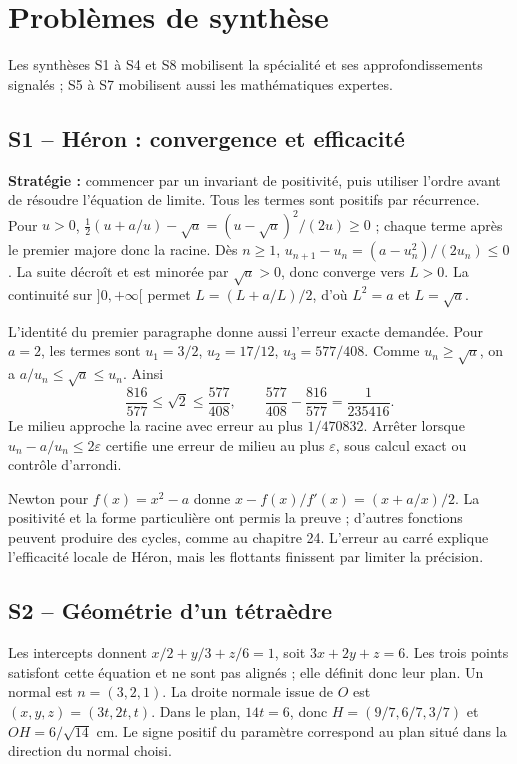 \chapter{Problèmes de synthèse}
Les synthèses S1 à S4 et S8 mobilisent la spécialité et ses approfondissements signalés ; S5 à S7 mobilisent aussi les mathématiques expertes.
\section{S1 -- Héron : convergence et efficacité}
\textbf{Stratégie :} commencer par un invariant de positivité, puis utiliser l'ordre avant de résoudre l'équation de limite.
Tous les termes sont positifs par récurrence. Pour $u>0$, $\frac12(u+a/u)-\sqrt a=(u-\sqrt a)^2/(2u)\ge0$ ; chaque terme après le premier majore donc la racine.
Dès $n\ge1$, $u_{n+1}-u_n=(a-u_n^2)/(2u_n)\le0$. La suite décroît et est minorée par $\sqrt a>0$, donc converge vers $L>0$. La continuité sur $]0,+\infty[$ permet $L=(L+a/L)/2$, d'où $L^2=a$ et $L=\sqrt a$.

L'identité du premier paragraphe donne aussi l'erreur exacte demandée. Pour $a=2$, les termes sont $u_1=3/2$, $u_2=17/12$, $u_3=577/408$. Comme $u_n\ge\sqrt a$, on a $a/u_n\le\sqrt a\le u_n$. Ainsi
\[
\frac{816}{577}\le\sqrt2\le\frac{577}{408},\qquad
\frac{577}{408}-\frac{816}{577}=\frac1{235416}.
\]
Le milieu approche la racine avec erreur au plus $1/470832$. Arrêter lorsque $u_n-a/u_n\le2\varepsilon$ certifie une erreur de milieu au plus $\varepsilon$, sous calcul exact ou contrôle d'arrondi.

Newton pour $f(x)=x^2-a$ donne $x-f(x)/f'(x)=(x+a/x)/2$. La positivité et la forme particulière ont permis la preuve ; d'autres fonctions peuvent produire des cycles, comme au chapitre 24. L'erreur au carré explique l'efficacité locale de Héron, mais les flottants finissent par limiter la précision.

\section{S2 -- Géométrie d’un tétraèdre}
Les intercepts donnent $x/2+y/3+z/6=1$, soit $3x+2y+z=6$. Les trois points satisfont cette équation et ne sont pas alignés ; elle définit donc leur plan. Un normal est $n=(3,2,1)$.
La droite normale issue de $O$ est $(x,y,z)=(3t,2t,t)$. Dans le plan, $14t=6$, donc $H=(9/7,6/7,3/7)$ et $OH=6/\sqrt{14}$ cm. Le signe positif du paramètre correspond au plan situé dans la direction du normal choisi.

